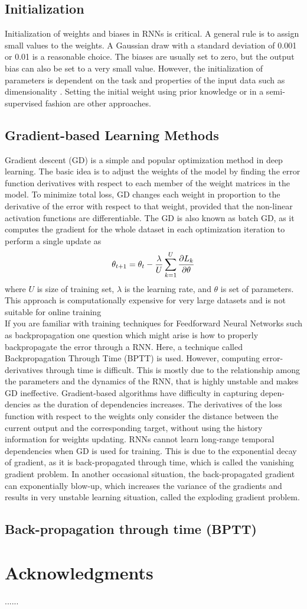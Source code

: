 \documentclass{article}
\begin{document}
\subsection{Initialization}
Initialization of weights and biases in RNNs is critical.
A general rule is to assign small values to the weights. A
Gaussian draw with a standard deviation of 0.001 or 0.01 is a
reasonable choice. The biases are usually set to zero,
but the output bias can also be set to a very small value.
However, the initialization of parameters is dependent on the
task and properties of the input data such as dimensionality .
Setting the initial weight using prior knowledge or in a semi-supervised fashion are other approaches.
\subsection{Gradient-based Learning Methods}
Gradient descent (GD) is a simple and popular optimization
method in deep learning. The basic idea is to adjust the
weights of the model by finding the error function derivatives
with respect to each member of the weight matrices in the
model. To minimize total loss, GD changes each weight
in proportion to the derivative of the error with respect to
that weight, provided that the non-linear activation functions
are differentiable. The GD is also known as batch GD,
as it computes the gradient for the whole dataset in each
optimization iteration to perform a single update as
\begin{equation}
  \theta_{t+1} = \theta_t - \frac{\lambda}{U}\sum_{k=1}^U \pdv{L_k}{\theta}
\end{equation}
where $U$ is size of training set, $\lambda$ is the learning rate, and $\theta$ is
set of parameters. This approach is computationally expensive
for very large datasets and is not suitable for online training \\

If you are familiar with training techniques for Feedforward Neural Networks such as backpropagation
one question which might arise is how to properly backpropagate the error through a RNN. Here, a
technique called Backpropagation Through Time (BPTT) is used. However, computing
error-derivatives through time is difficult. This is mostly
due to the relationship among the parameters and the dynamics
of the RNN, that is highly unstable and makes GD ineffective.
Gradient-based algorithms have difficulty in capturing depen-
dencies as the duration of dependencies increases. The
derivatives of the loss function with respect to the weights
only consider the distance between the current output and the
corresponding target, without using the history information for
weights updating. RNNs cannot learn long-range temporal dependencies when GD is used for training. This is due
to the exponential decay of gradient, as it is back-propagated
through time, which is called the vanishing gradient problem.
In another occasional situation, the back-propagated gradient
can exponentially blow-up, which increases the variance of
the gradients and results in very unstable learning situation,
called the exploding gradient problem.
\subsection{Back-propagation through time (BPTT)}
\section*{Acknowledgments}
......
\end{document}
